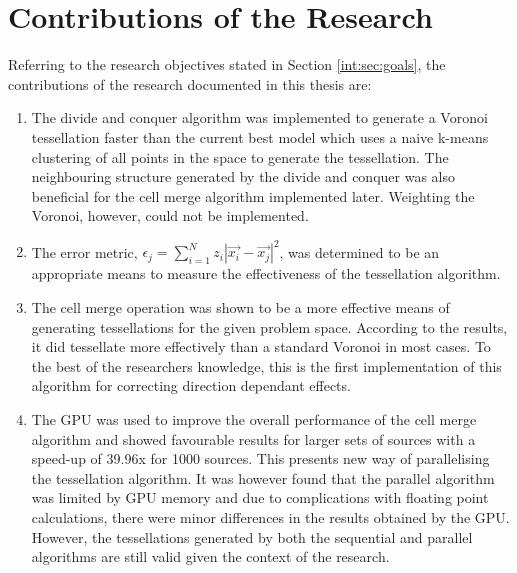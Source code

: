 \section{Contributions of the Research}
Referring to the research objectives stated in Section \ref{int:sec:goals}, the contributions of the research documented in this thesis are:
\begin{enumerate}
\item The divide and conquer algorithm was implemented to generate a Voronoi tessellation faster than the current best model which uses a naive k-means clustering of all points in the space to generate the tessellation. The neighbouring structure generated by the divide and conquer was also beneficial for the cell merge algorithm implemented later. Weighting the Voronoi, however, could not be implemented.
\item The error metric, $\epsilon_j = \sum^N_{i=1} z_i|\vec{x_i} - \vec{x_j}|^2$, was determined to be an appropriate means to measure the effectiveness of the tessellation algorithm.
\item The cell merge operation was shown to be a more effective means of generating tessellations for the given problem space. According to the results, it did tessellate more effectively than a standard Voronoi in most cases. To the best of the researchers knowledge, this is the first implementation of this algorithm for correcting direction dependant effects.
\item The GPU was used to improve the overall performance of the cell merge algorithm and showed favourable results for larger sets of sources with a speed-up of 39.96x for 1000 sources. This presents new way of parallelising the tessellation algorithm. It was however found that the parallel algorithm was limited by GPU memory and due to complications with floating point calculations, there were minor differences in the results obtained by the GPU. However, the tessellations generated by both the sequential and parallel algorithms are still valid given the context of the research.
\end{enumerate}
